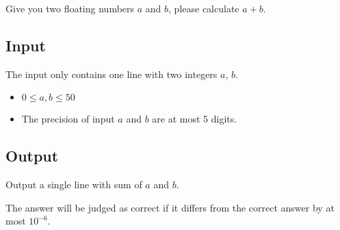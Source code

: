 
Give you two floating numbers $a$ and $b$, please calculate $a+b$.

\subsection*{Input}

The input only contains one line with two integers $a$, $b$.

\begin{itemize}
    \item $0 \leq a, b \leq 50$
    \item The precision of input $a$ and $b$ are at most 5 digits.
\end{itemize}

\subsection*{Output}

Output a single line with sum of $a$ and $b$.

The answer will be judged as correct if it differs from the correct answer by at most $10^{-6}$.
